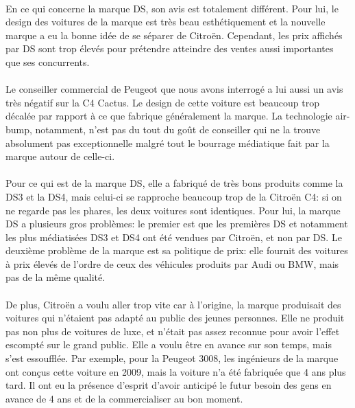\documentclass[12pt]{article}\usepackage[]{graphicx}\usepackage[]{color}
\begin{document}
\paragraph{} En ce qui concerne la marque DS, son avis est totalement
différent. Pour lui, le design des voitures de la marque est très beau
esthétiquement et la nouvelle marque a eu la bonne idée de se séparer de
Citroën. Cependant, les prix affichés par DS sont trop élevés pour prétendre
atteindre des ventes aussi importantes que ses concurrents.

\paragraph{} Le conseiller commercial de Peugeot que nous avons interrogé a lui
aussi un avis très négatif sur la C4 Cactus. Le design de cette voiture est
beaucoup trop décalée par rapport à ce que fabrique généralement la marque. La
technologie air-bump, notamment, n'est pas du tout du goût de conseiller qui ne
la trouve absolument pas exceptionnelle malgré tout le bourrage médiatique fait
par la marque autour de celle-ci.

\paragraph{} Pour ce qui est de la marque DS, elle a fabriqué de très bons
produits comme la DS3 et la DS4, mais celui-ci se rapproche beaucoup trop de la
Citroën C4: si on ne regarde pas les phares, les deux voitures sont identiques.
Pour lui, la marque DS a plusieurs gros problèmes: le premier est que les
premières DS et notamment les plus médiatisées DS3 et DS4 ont été vendues par
Citroën, et non par DS. Le deuxième problème de la marque est sa politique de
prix: elle fournit des voitures à prix élevés de l'ordre de ceux des véhicules
produits par Audi ou BMW, mais pas de la même qualité.

\paragraph{} De plus, Citroën a voulu aller trop vite car à l'origine, la
marque produisait des voitures qui n'étaient pas adapté au public des jeunes
personnes.  Elle ne produit pas non plus de voitures de luxe, et n'était pas
assez reconnue pour avoir l'effet escompté sur le grand public. Elle a voulu
être en avance sur son temps, mais s'est essoufflée. Par exemple, pour la
Peugeot 3008, les ingénieurs de la marque ont conçus cette voiture en 2009,
mais la voiture n'a été fabriquée que 4 ans plus tard. Il ont eu la présence
d'esprit d'avoir anticipé le futur besoin des gens en avance de 4 ans et de la
commercialiser au bon moment.
\end{document}
